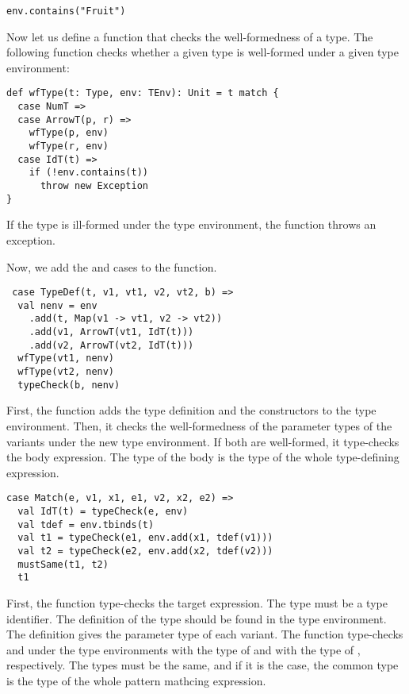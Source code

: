 \begin{verbatim}
env.contains("Fruit")
\end{verbatim}

Now let us define a function that checks the well-formedness of a type.
The following  function checks whether a given type is well-formed
under a given type environment:

\begin{verbatim}
def wfType(t: Type, env: TEnv): Unit = t match {
  case NumT =>
  case ArrowT(p, r) =>
    wfType(p, env)
    wfType(r, env)
  case IdT(t) =>
    if (!env.contains(t))
      throw new Exception
}
\end{verbatim}

If the type is ill-formed under the type environment, the function throws
an exception.

Now, we add the  and  cases to the  function.

\begin{verbatim}
 case TypeDef(t, v1, vt1, v2, vt2, b) =>
  val nenv = env
    .add(t, Map(v1 -> vt1, v2 -> vt2))
    .add(v1, ArrowT(vt1, IdT(t)))
    .add(v2, ArrowT(vt2, IdT(t)))
  wfType(vt1, nenv)
  wfType(vt2, nenv)
  typeCheck(b, nenv)
\end{verbatim}

First, the function adds the type definition and the constructors to the type
environment. Then, it checks the well-formedness of the parameter types of the
variants under the new type environment. If both are well-formed,
it type-checks the body expression. The type of the body is the type of the
whole type-defining expression.

\begin{verbatim}
case Match(e, v1, x1, e1, v2, x2, e2) =>
  val IdT(t) = typeCheck(e, env)
  val tdef = env.tbinds(t)
  val t1 = typeCheck(e1, env.add(x1, tdef(v1)))
  val t2 = typeCheck(e2, env.add(x2, tdef(v2)))
  mustSame(t1, t2)
  t1
\end{verbatim}

First, the function type-checks the target expression. The type must be
a type identifier. The definition of the type should be found in the type
environment. The definition gives the parameter type of each variant. The
function type-checks  and  under the type environments with the
type of  and with the type of , respectively.
The types must be the same, and if it is the case, the common
type is the type of the whole pattern mathcing expression.

